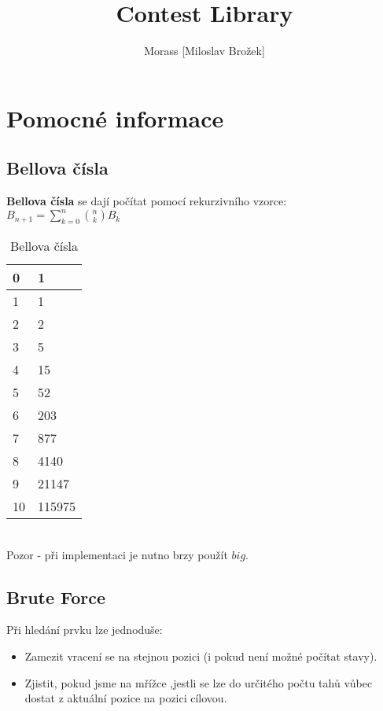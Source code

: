 \documentclass[11pt]{article}
\date{} %
\title{Contest Library}
\author{Morass [Miloslav Brožek]}
\begin{document}
\maketitle
\tableofcontents

\newpage\section{Pomocné informace}
\subsection{Bellova čísla}
\textbf{Bellova čísla} se dají počítat pomocí rekurzivního vzorce: $B_{n+1}=\sum\limits_{k=0}^n {n\choose k}B_k$
\begin{table}[h]
\centering
\caption{Bellova čísla}
\begin{tabular}{|l|l|}
\hline
0&1\\ \hline
1&1\\ \hline
2&2\\ \hline
3&5\\ \hline
4&15\\ \hline
5&52\\ \hline
6&203\\ \hline
7&877\\ \hline
8&4140\\ \hline
9&21147\\ \hline
10&115975\\ \hline
\end{tabular}
\end{table}
\\Pozor - při implementaci je nutno brzy použít $big$.
\subsection{Brute Force}
Při hledání prvku lze jednoduše:
\begin{itemize}
\item Zamezit vracení se na stejnou pozici (i pokud není možné počítat stavy).
\item Zjistit, pokud jsme na mřížce ,jestli se lze do určitého počtu tahů vůbec dostat z aktuální pozice na pozici cílovou.
\end{itemize}
\end{document}

